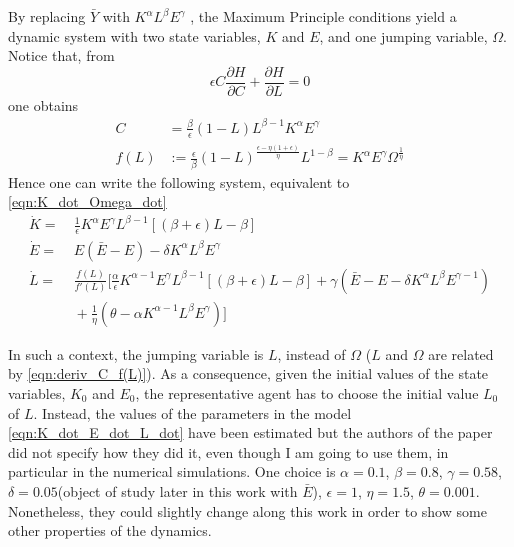 By replacing $\bar{Y}$ with $K^\alpha L^\beta E^\gamma$ , the Maximum Principle conditions yield a dynamic system with two state variables, $K$ and $E$, and one jumping variable, $\Omega$. Notice that, from 
$$\epsilon C\frac{\partial H}{\partial C}+\frac{\partial H}{\partial L}=0$$
one obtains
\begin{equation} \label{eqn:deriv_C_f(L)}
\begin{split}
	C& =\frac{\beta}{\epsilon}(1-L)L^{\beta-1}K^\alpha E^\gamma \\
	f(L)& :=\frac{\epsilon}{\beta}(1-L)^{\frac{\epsilon-\eta(1+\epsilon)}{\eta}}L^{1-\beta}=K^\alpha E^\gamma \Omega^{\frac{1}{\eta}}
\end{split}
\end{equation}
Hence one can write the following system, equivalent to \eqref{eqn:K_dot_Omega_dot}
\begin{equation} \label{eqn:K_dot_E_dot_L_dot}
	\begin{split}
		\dot{K} =&\ \frac{1}{\epsilon} K^\alpha E^\gamma  L^{\beta-1}[(\beta+\epsilon)L-\beta] \\
		\dot{E} =&\ E(\bar{E}-E)-\delta K^\alpha L^\beta E^\gamma \\
		\dot{L} =&\ \frac{f(L)}{f'(L)} \Big[\frac{\alpha}{\epsilon}K^{\alpha-1} E^\gamma  L^{\beta-1}[(\beta+\epsilon)L-\beta]+\gamma(\bar{E}-E-\delta K^\alpha L^\beta E^{\gamma-1})\\
		&\ +\frac{1}{\eta}(\theta-\alpha K^{\alpha-1}L^\beta E^\gamma) \Big]
	\end{split}
\end{equation}

In such a context, the jumping variable is $L$, instead of $\Omega$ ($L$ and $\Omega$ are related by \eqref{eqn:deriv_C_f(L)}). As a consequence, given the initial values of the state variables, $K_0$ and $E_0$, the representative agent has to choose the initial value $L_0$ of $L$. Instead, the values of the parameters in the model \eqref{eqn:K_dot_E_dot_L_dot} have been estimated but the authors of the paper did not specify how they did it, even though I am going to use them, in particular in the numerical simulations. One choice is $\alpha=0.1$, $\beta=0.8$, $\gamma=0.58$, $\delta=0.05$(object of study later in this work with $\bar{E}$), $\epsilon=1$, $\eta=1.5$, $\theta=0.001$. Nonetheless, they could slightly change along this work in order to show some other properties of the dynamics.